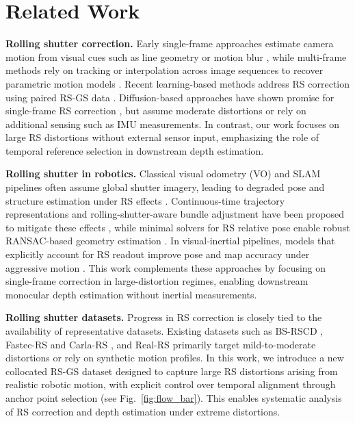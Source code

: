 
\section{Related Work}
\label{sec:related_works}

\noindent \textbf{Rolling shutter correction.}
Early single-frame approaches estimate camera motion from visual cues such as line geometry or motion blur \cite{BowsToArrows, Manhattan,MotionBlur}, while multi-frame methods rely on tracking or interpolation across image sequences to recover parametric motion models \cite{AnalysisAndCompensation, RemovingWobble,CFRS}.
Recent learning-based methods address RS correction using paired RS-GS data \cite{DeepUnrollNet,RS-Diffusion}. Diffusion-based approaches have shown promise for single-frame RS correction \cite{RS-Diffusion}, but assume moderate distortions or rely on additional sensing such as IMU measurements. In contrast, our work focuses on large RS distortions without external sensor input, emphasizing the role of temporal reference selection in downstream depth estimation.

\vspace{1mm}
\noindent \textbf{Rolling shutter in robotics.}  
Classical visual odometry (VO) and SLAM pipelines often assume global shutter imagery, leading to degraded pose and structure estimation under RS effects \cite{Hedborg2012,Meingast2005}. Continuous-time trajectory representations and rolling-shutter-aware bundle adjustment have been proposed to mitigate these effects \cite{mo2022imu,Furgale2012}, while minimal solvers for RS relative pose enable robust RANSAC-based geometry estimation \cite{Albl2015,Saurer2015}. In visual-inertial pipelines, models that explicitly account for RS readout improve pose and map accuracy under aggressive motion \cite{Leutenegger2015,Rosinol2020,Schubert2019}. This work complements these approaches by focusing on single-frame correction in large-distortion regimes, enabling downstream monocular depth estimation without inertial measurements.


\vspace{1mm}
\noindent \textbf{Rolling shutter datasets.}
Progress in RS correction is closely tied to the availability of representative datasets. Existing datasets such as BS-RSCD \cite{RSCD}, Fastec-RS and Carla-RS \cite{DeepUnrollNet}, and Real-RS \cite{RS-Diffusion} primarily target mild-to-moderate distortions or rely on synthetic motion profiles. In this work, we introduce a new collocated RS-GS dataset designed to capture large RS distortions arising from realistic robotic motion, with explicit control over temporal alignment through anchor point selection (see Fig.~\ref{fig:flow_bar}). This enables systematic analysis of RS correction and depth estimation under extreme distortions.

